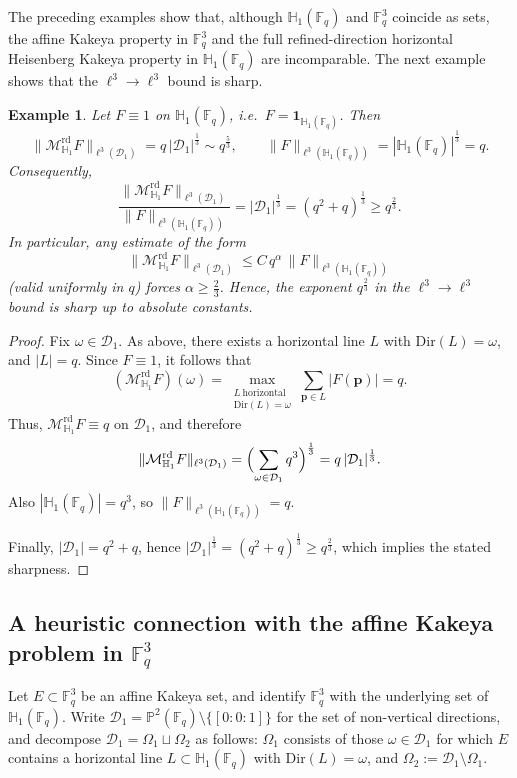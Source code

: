 \documentclass[11pt]{article}
\newtheorem{example}{Example}[section]
\newcommand{\1}{\mathbf 1}
\begin{document}
The preceding examples show that, although $\mathbb{H}_1(\mathbb{F}_q)$ and $\mathbb{F}_q^3$ coincide
as sets, the affine Kakeya property in $\mathbb{F}_q^3$ and the full refined-direction horizontal
Heisenberg Kakeya property in $\mathbb{H}_1(\mathbb{F}_q)$ are incomparable. The next example shows that the $\ell^3\to\ell^3$ bound is sharp.


\begin{example} \label{ex:rd-l3-sharp}
Let $F\equiv 1$ on $\mathbb{H}_1(\mathbb{F}_q)$, i.e.\ $F=\mathbf{1}_{\mathbb{H}_1(\mathbb{F}_q)}$.
Then
\[
\|\mathcal{M}^{\mathrm{rd}}_{\mathbb{H}_1}F\|_{\ell^3(\mathcal{D}_1)}
=
q\,|\mathcal{D}_1|^{\frac{1}{3}}
\sim
q^{\frac{5}{3}},
\qquad
\|F\|_{\ell^3(\mathbb{H}_1(\mathbb{F}_q))}
=
|\mathbb{H}_1(\mathbb{F}_q)|^{\frac{1}{3}}
=
q.
\]
Consequently,
\[
\frac{\|\mathcal{M}^{\mathrm{rd}}_{\mathbb{H}_1}F\|_{\ell^3(\mathcal{D}_1)}}
{\|F\|_{\ell^3(\mathbb{H}_1(\mathbb{F}_q))}}
=
|\mathcal{D}_1|^{\frac{1}{3}}
=
(q^2+q)^{\frac{1}{3}}
\geq
q^{\frac{2}{3}}.
\]
In particular, any estimate of the form
\[
\|\mathcal{M}^{\mathrm{rd}}_{\mathbb{H}_1}F\|_{\ell^3(\mathcal{D}_1)}
\le C\,q^\alpha\,\|F\|_{\ell^3(\mathbb{H}_1(\mathbb{F}_q))}
\]
(valid uniformly in $q$) forces $\alpha\ge \frac23$. Hence, the exponent $q^{\frac{2}{3}}$ in the
$\ell^3\to\ell^3$ bound is sharp up to absolute constants.
\end{example}

\begin{proof}
Fix $\omega\in\mathcal{D}_1$.  As above, there exists a horizontal line $L$ with $\mathrm{Dir}(L)=\omega$,
and $|L|=q$.  Since $F\equiv 1$, it follows that
\[
(\mathcal{M}^{\mathrm{rd}}_{\mathbb{H}_1}F)(\omega)
=
\max_{\substack{L\ \mathrm{horizontal}\\ \mathrm{Dir}(L)=\omega}}
\sum_{\mathbf{p}\in L}|F(\mathbf{p})|
=
q.
\]
Thus, $\mathcal{M}^{\mathrm{rd}}_{\mathbb{H}_1}F\equiv q$ on $\mathcal{D}_1$, and therefore
\[
\|\mathcal{M}^{\mathrm{rd}}_{\mathbb{H}_1}F\|_{\ell^3(\mathcal{D}_1)}
=
\Bigl(\sum_{\omega\in\mathcal{D}_1} q^3\Bigr)^{\frac{1}{3}}
=
q\,|\mathcal{D}_1|^{\frac{1}{3}}.
\]
Also $|\mathbb{H}_1(\mathbb{F}_q)|=q^3$, so $\|F\|_{\ell^3(\mathbb{H}_1(\mathbb{F}_q))}=q$.

Finally, $|\mathcal{D}_1|=q^2+q$, hence $|\mathcal{D}_1|^{\frac{1}{3}}=(q^2+q)^{\frac{1}{3}}\geq q^{\frac{2}{3}}$, which implies the stated sharpness.
\end{proof}




\subsection{A heuristic connection with the affine Kakeya problem in $\mathbb{F}_q^3$}\label{sec11.2}
Let \(E\subset \mathbb F_q^3\) be an affine Kakeya set, and identify \(\mathbb F_q^3\) with the underlying set of \(\mathbb H_1(\mathbb F_q)\).
Write \(\mathcal D_1=\mathbb P^2(\mathbb F_q)\setminus\{[0:0:1]\}\) for the set of non-vertical directions, and decompose
\(\mathcal D_1=\Omega_1\sqcup\Omega_2\) as follows: \(\Omega_1\) consists of those \(\omega\in\mathcal D_1\) for which \(E\) contains a horizontal line
\(L\subset \mathbb H_1(\mathbb F_q)\) with \(\mathrm{Dir}(L)=\omega\), and \(\Omega_2:=\mathcal D_1\setminus\Omega_1\).
\end{document}
